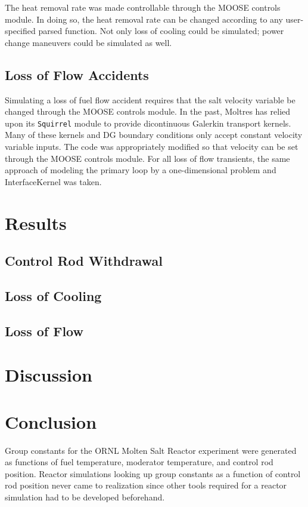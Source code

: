 \documentclass[12pt]{article}
\begin{document}
The heat removal rate was made controllable through the MOOSE controls module. In doing so, the heat removal rate can be changed according to any user-specified parsed function. Not only loss of cooling could be simulated; power change maneuvers could be simulated as well.

\subsection{Loss of Flow Accidents}

Simulating a loss of fuel flow accident requires that the salt velocity variable be changed through the MOOSE controls module. In the past, Moltres \cite{moltres} has relied upon its \texttt{Squirrel} module to provide dicontinuous Galerkin transport kernels. Many of these kernels and DG boundary conditions only accept constant velocity variable inputs. The code was appropriately modified so that velocity can be set through the MOOSE controls module. For all loss of flow transients, the same approach of modeling the primary loop by a one-dimensional problem and InterfaceKernel was taken.

\section{Results}

\subsection{Control Rod Withdrawal}

\subsection{Loss of Cooling}

\subsection{Loss of Flow}

\section{Discussion}



\section{Conclusion}
Group constants for the ORNL Molten Salt Reactor experiment were generated as functions of fuel temperature, moderator temperature, and control rod position. Reactor simulations looking up group constants as a function of control rod position never came to realization since other tools required for a reactor simulation had to be developed beforehand.
\end{document}
